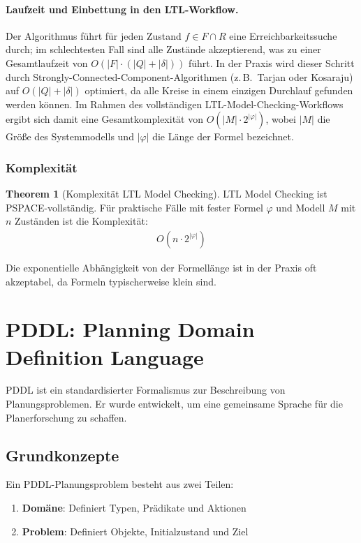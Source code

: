 ﻿\documentclass[a4paper,12pt]{article}
\theoremstyle{definition}
\newtheorem{theorem}{Theorem}[section]
\begin{document}
\paragraph*{Laufzeit und Einbettung in den LTL-Workflow.}
Der Algorithmus führt für jeden Zustand $f \in F \cap R$ eine Erreichbarkeitssuche durch; im schlechtesten Fall sind alle Zustände akzeptierend, was zu einer Gesamtlaufzeit von $O(|F| \cdot (|Q| + |\delta|))$ führt. In der Praxis wird dieser Schritt durch Strongly-Connected-Component-Algorithmen (z.\,B.\ Tarjan oder Kosaraju) auf $O(|Q| + |\delta|)$ optimiert, da alle Kreise in einem einzigen Durchlauf gefunden werden können. Im Rahmen des vollständigen LTL-Model-Checking-Workflows ergibt sich damit eine Gesamtkomplexität von $O(|M| \cdot 2^{|\varphi|})$, wobei $|M|$ die Größe des Systemmodells und $|\varphi|$ die Länge der Formel bezeichnet.

\subsubsection{Komplexität}

\begin{theorem}[Komplexität LTL Model Checking]
	LTL Model Checking ist PSPACE-vollständig. Für praktische Fälle mit fester Formel $\varphi$ und Modell $M$ mit $n$ Zuständen ist die Komplexität:
	\begin{align}
	O(n \cdot 2^{|\varphi|})
	\end{align}
\end{theorem}

Die exponentielle Abhängigkeit von der Formellänge ist in der Praxis oft akzeptabel, da Formeln typischerweise klein sind.

\section{PDDL: Planning Domain Definition Language}

PDDL ist ein standardisierter Formalismus zur Beschreibung von Planungsproblemen. Er wurde entwickelt, um eine gemeinsame Sprache für die Planerforschung zu schaffen.

\subsection{Grundkonzepte}

Ein PDDL-Planungsproblem besteht aus zwei Teilen:
\begin{enumerate}
	\item \textbf{Domäne}: Definiert Typen, Prädikate und Aktionen
	\item \textbf{Problem}: Definiert Objekte, Initialzustand und Ziel
\end{enumerate}
\end{document}
